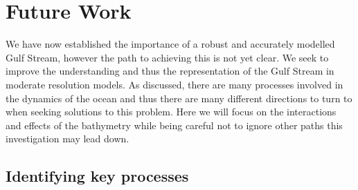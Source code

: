 \documentclass[..\EOYR.tex]{subfiles}
\begin{document}
\section{Future Work}
\label{SEC:FutureWork}

We have now established the importance of a robust and accurately modelled Gulf Stream, however the path to achieving this is not yet clear.
We seek to improve the understanding and thus the representation of the Gulf Stream in moderate resolution models. As discussed, there are many processes involved in the dynamics of the ocean and thus there are many different directions to turn to when seeking solutions to this problem. Here we will focus on the interactions and effects of the bathymetry while being careful not to ignore other paths this investigation may lead down. 

\subsection{Identifying key processes}
\label{SSEC:IdentifyingKeyProcesses}


\end{document}
